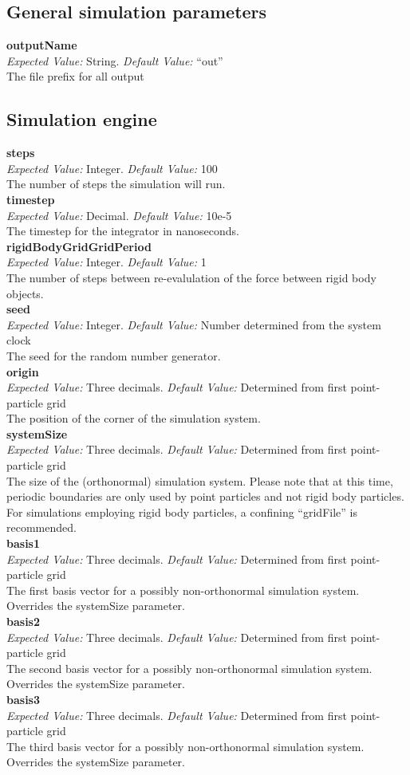 \documentclass[10pt]{article}
\begin{document}
\newcommand{\keyword}[4]{\noindent\textbf{#1}\\\textit{Expected Value:} #2.  \textit{Default Value:} #3\\#4\\}

\subsection{General simulation parameters}

\keyword{outputName}{String}{``out''}
{The file prefix for all output}

\subsection{Simulation engine}


\keyword{steps}{Integer}{100}
{The number of steps the simulation will run.}

\keyword{timestep}{Decimal}{10e-5}
{The timestep for the integrator in nanoseconds.}

\keyword{rigidBodyGridGridPeriod}{Integer}{1}
{The number of steps between re-evalulation of the force between rigid body objects.}

\keyword{seed}{Integer}{Number determined from the system clock}
{The seed for the random number generator.}

\keyword{origin}{Three decimals}{Determined from first point-particle grid}
{The position of the corner of the simulation system.}

\keyword{systemSize}{Three decimals}{Determined from first point-particle grid}
{The size of the (orthonormal) simulation system. Please note that at this time, periodic boundaries are only used by point particles and not rigid body particles. For simulations employing rigid body particles, a confining ``gridFile'' is recommended. }

\keyword{basis1}{Three decimals}{Determined from first point-particle grid}
{The first basis vector for a possibly non-orthonormal simulation system. Overrides the systemSize parameter.}

\keyword{basis2}{Three decimals}{Determined from first point-particle grid}
{The second basis vector for a possibly non-orthonormal simulation system. Overrides the systemSize parameter.}

\keyword{basis3}{Three decimals}{Determined from first point-particle grid}
{The third basis vector for a possibly non-orthonormal simulation system. Overrides the systemSize parameter.}
\end{document}
